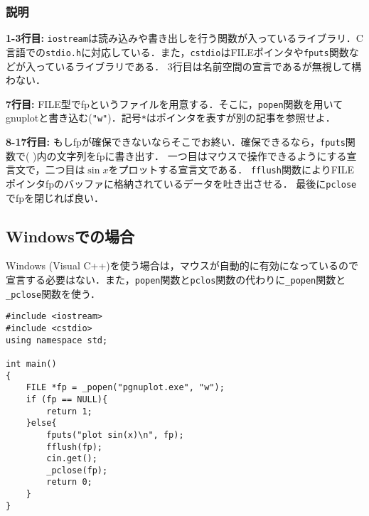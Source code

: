 \subsubsection{ 説明}
\textbf{1-3行目:}
\texttt{iostream}は読み込みや書き出しを行う関数が入っているライブラリ．C言語での\texttt{stdio.h}に対応している．また，\texttt{cstdio}はFILEポインタや\texttt{fputs}関数などが入っているライブラリである．
3行目は名前空間の宣言であるが無視して構わない．

\textbf{7行目:}
FILE型でfpというファイルを用意する．そこに，\texttt{popen}関数を用いてgnuplotと書き込む(\texttt{"w"})．記号\texttt{*}はポインタを表すが別の記事を参照せよ．

\textbf{8-17行目:}
もしfpが確保できないならそこでお終い．確保できるなら，\texttt{fputs}関数で( )内の文字列をfpに書き出す．
一つ目はマウスで操作できるようにする宣言文で，二つ目は$\sin x$をプロットする宣言文である．
\texttt{fflush}関数によりFILEポインタfpのバッファに格納されているデータを吐き出させる．
最後に\texttt{pclose}でfpを閉じれば良い．


\subsection{ Windowsでの場合}
Windows (Visual C++)を使う場合は，マウスが自動的に有効になっているので宣言する必要はない．また，\texttt{popen}関数と\texttt{pclos}関数の代わりに\texttt{\_popen}関数と\texttt{\_pclose}関数を使う．
\begin{lstlisting}[caption=Visual C++のコード内からgnuplotを呼び出し$\sin x$を描く]
#include <iostream>
#include <cstdio>
using namespace std;

int main()
{
	FILE *fp = _popen("pgnuplot.exe", "w");
	if (fp == NULL){
		return 1;
	}else{
		fputs("plot sin(x)\n", fp);
		fflush(fp);
		cin.get();
		_pclose(fp);
		return 0;
	}
}
\end{lstlisting}
